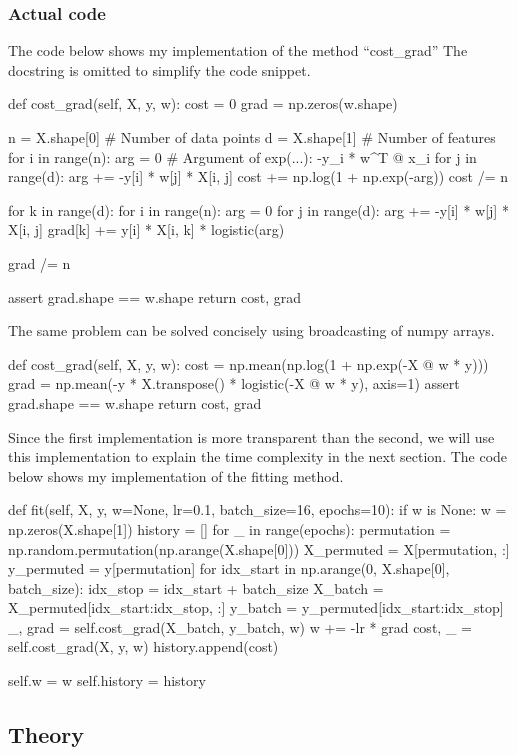 \documentclass{article}
\begin{document}
	\subsubsection*{Actual code}
	The code below shows my implementation of the method ``cost\_grad''
	The docstring is omitted to simplify the code snippet.
	\begin{python}
def cost_grad(self, X, y, w):
	cost = 0
	grad = np.zeros(w.shape)
	
	n = X.shape[0]  # Number of data points
	d = X.shape[1]  # Number of features
	for i in range(n):
		arg = 0    # Argument of exp(...): -y_i * w^T @ x_i
		for j in range(d):
			arg += -y[i] * w[j] * X[i, j]
		cost += np.log(1 + np.exp(-arg))
	cost /= n
	
	for k in range(d):
		for i in range(n):
			arg = 0
			for j in range(d):
				arg += -y[i] * w[j] * X[i, j]
			grad[k] += y[i] * X[i, k] * logistic(arg)
		
	grad /= n

	assert grad.shape == w.shape
	return cost, grad
	\end{python}
	The same problem can be solved concisely using broadcasting of numpy arrays.
	\begin{python}
def cost_grad(self, X, y, w):
	cost = np.mean(np.log(1 + np.exp(-X @ w * y)))
	grad = np.mean(-y * X.transpose() * logistic(-X @ w * y), axis=1)
	assert grad.shape == w.shape
	return cost, grad
	\end{python}
	Since the first implementation is more transparent than the second, we will use this implementation to explain the time complexity in the next section.
	The code below shows my implementation of the fitting method.
	\begin{python}
def fit(self, X, y, w=None, lr=0.1, batch_size=16, epochs=10):
	if w is None:
		w = np.zeros(X.shape[1])
	history = []
	for _ in range(epochs):
		permutation = np.random.permutation(np.arange(X.shape[0]))
		X_permuted = X[permutation, :]
		y_permuted = y[permutation]
		for idx_start in np.arange(0, X.shape[0], batch_size):
			idx_stop = idx_start + batch_size
			X_batch = X_permuted[idx_start:idx_stop, :]
			y_batch = y_permuted[idx_start:idx_stop]
			_, grad = self.cost_grad(X_batch, y_batch, w)
			w += -lr * grad
		cost, _ = self.cost_grad(X, y, w)
		history.append(cost)

	self.w = w
	self.history = history
	\end{python}
\subsection*{Theory}
\end{document}
